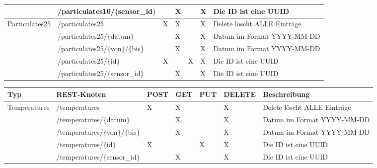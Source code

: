 \begin{landscape}
\begin{table}[H]
\begin{longtable}{lllllll}
                                      & /particulates10/$\{$sensor\_id$\}$  &  & X & & X & Die ID ist eine UUID           \\ \midrule
      \multirow{5}{*}{Particulates25} & /particulates25               & X & X & & X & Delete löscht ALLE Einträge   \\
                                      & /particulates25/$\{$datum$\}$       &  & X & & X & Datum im Format YYYY-MM-DD     \\
                                      & /particulates25/$\{$von$\}$/$\{$bis$\}$   &  & X & & X & Datum im Format YYYY-MM-DD     \\
                                      & /particulates25/$\{$id$\}$          & X & & X & X & Die ID ist eine UUID          \\
                                      & /particulates25/$\{$sensor\_id$\}$  &  & X & & X & Die ID ist eine UUID           \\ \midrule
    \end{longtable}
  \end{table}

  \newpage

  \begin{table}[H]
    \begin{longtable}{lllllll}
      \textbf{Typ} & \textbf{REST-Knoten} & \textbf{POST} & \textbf{GET} & \textbf{PUT} & \textbf{DELETE} & \textbf{Beschreibung} \\ \toprule
      \multirow{5}{*}{Temperatures}   & /temperatures                 & X & X & & X & Delete löscht ALLE Einträge   \\
                                      & /temperatures/$\{$datum$\}$         &  & X & & X & Datum im Format YYYY-MM-DD     \\
                                      & /temperatures/$\{$von$\}$/$\{$bis$\}$     &  & X & & X & Datum im Format YYYY-MM-DD     \\
                                      & /temperatures/$\{$id$\}$            & X & & X & X & Die ID ist eine UUID          \\
                                      & /temperatures/$\{$sensor\_id$\}$    &  & X & & X & Die ID ist eine UUID           \\ \midrule


\end{longtable}
\end{table}
\end{landscape}
